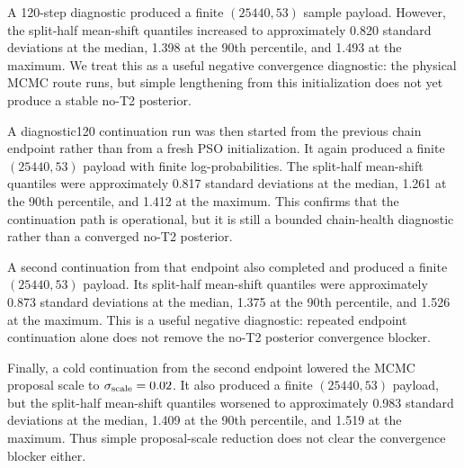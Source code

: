 \documentclass[11pt]{article}
\begin{document}
A 120-step diagnostic produced a finite \((25440,53)\) sample payload.
However, the split-half mean-shift quantiles increased to approximately
0.820 standard deviations at the median, 1.398 at the 90th percentile, and
1.493 at the maximum. We treat this as a useful negative convergence
diagnostic: the physical MCMC route runs, but simple lengthening from this
initialization does not yet produce a stable no-T2 posterior.

A diagnostic120 continuation run was then started from the previous chain
endpoint rather than from a fresh PSO initialization. It again produced a
finite \((25440,53)\) payload with finite log-probabilities. The split-half
mean-shift quantiles were approximately 0.817 standard deviations at the
median, 1.261 at the 90th percentile, and 1.412 at the maximum. This confirms
that the continuation path is operational, but it is still a bounded
chain-health diagnostic rather than a converged no-T2 posterior.

A second continuation from that endpoint also completed and produced a finite
\((25440,53)\) payload. Its split-half mean-shift quantiles were approximately
0.873 standard deviations at the median, 1.375 at the 90th percentile, and
1.526 at the maximum. This is a useful negative diagnostic: repeated endpoint
continuation alone does not remove the no-T2 posterior convergence blocker.

Finally, a cold continuation from the second endpoint lowered the MCMC
proposal scale to \(\sigma_{\rm scale}=0.02\). It also produced a finite
\((25440,53)\) payload, but the split-half mean-shift quantiles worsened to
approximately 0.983 standard deviations at the median, 1.409 at the 90th
percentile, and 1.519 at the maximum. Thus simple proposal-scale reduction
does not clear the convergence blocker either.
\end{document}
